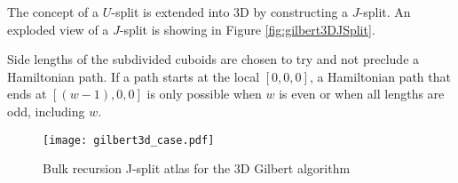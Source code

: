 The concept of a $U$-split is extended into 3D by constructing a $J$-split.
An exploded view of a $J$-split is showing in Figure \ref{fig:gilbert3DJSplit}.

Side lengths of the subdivided cuboids are chosen to try and not preclude a
Hamiltonian path.
If a path starts at the local $[0,0,0]$, a Hamiltonian path that ends
at $[(w-1),0,0]$ is only possible when $w$ is even or when all lengths are odd, including $w$.


\begin{figure*}[ht]
  \centering
  \texttt{[image: gilbert3d\_case.pdf]}
  \caption{ Bulk recursion J-split atlas for the 3D Gilbert algorithm }
  \label{fig:gilbert3DCase}
\end{figure*}

%
%
